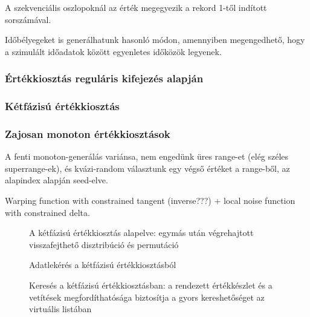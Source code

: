 \documentclass[
    parspace, %
    noindent, %
]{elteiktdk}[2023/10/30]
\begin{document}
A szekvenciális oszlopoknál az érték megegyezik a rekord 1-től indított sorszámával.

Időbélyegeket is generálhatunk hasonló módon,
amennyiben megengedhető, hogy a szimulált időadatok között egyenletes időközök legyenek.

\subsubsection{Értékkiosztás reguláris kifejezés alapján}


\subsubsection{Kétfázisú értékkiosztás}


\subsubsection{Zajosan monoton értékkiosztások}


A fenti monoton-generálás variánsa, nem engedünk üres range-et (elég széles superrange-ek),
és kvázi-random választunk egy végső értéket a range-ből, az alapindex alapján seed-elve.


Warping function with constrained tangent (inverse???) + local noise function with constrained delta.

\begin{figure}
\centering

\caption{A kétfázisú értékkiosztás alapelve: egymás után végrehajtott visszafejthető disztribúció és permutáció}
\label{A kétfázisú értékkiosztás alapelve}
\end{figure}

\begin{figure}
\centering

\caption{Adatlekérés a kétfázisú értékkiosztásból}
\label{Adatlekérés a kétfázisú értékkiosztásból}
\end{figure}

\begin{figure}
\centering

\caption{Keresés a kétfázisú értékkiosztásban: a rendezett értékkészlet és a vetítések megfordíthatósága biztosítja a gyors kereshetőséget az virtuális listában}
\label{Keresés a kétfázisú értékkiosztásban}
\end{figure}
\end{document}
